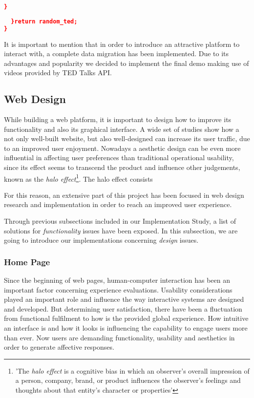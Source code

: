 \documentclass{acm_proc_article-sp}
\begin{document}
\begin{lstlisting}[language=json,firstnumber=1]
      }
      
  }return random_ted; 
}
\end{lstlisting}

It is important to mention that in order to introduce an attractive platform to interact with, a complete data migration has been implemented. Due to its advantages and popularity we decided to implement the final demo making use of videos provided by TED Talks API\cite{cettolo2012wit3}.

\subsection{Web Design}
While building a web platform, it is important to design how to improve its functionality and also its graphical interface. A wide set of studies \cite{allen2012smashing} show how a not only well-built website, but also well-designed can increase its user traffic, due to an improved user enjoyment. Nowadays a aesthetic design 
can be even more influential in affecting user preferences 
than traditional operational usability, since its effect seems to transcend the product and influence other judgements, known as the \textit{halo effect}\cite{de2006interaction}\cite{wiki:halo}\footnote{'The \textit{halo effect} is a cognitive bias in which an observer's overall impression of a person, company, brand, or product influences the observer's feelings and thoughts about that entity's character or properties'}. The halo effect consists 


For this reason, an extensive part of this project has been focused in web design research and implementation in order to reach an improved user experience. 

Through previous subsections included in our Implementation Study, a list of solutions for \textit{functionality} issues have been exposed. In this subsection, we are going to introduce our implementations concerning \textit{design} issues. 

\subsubsection{Home Page}
Since the beginning of web pages, human-computer interaction has been an important factor concerning experience evaluations\cite{monk2004product}. Usability considerations played an important role and influence the way interactive systems are designed and developed\cite{green2003pleasure}. But determining user satisfaction, there have been a  fluctuation from functional fulfilment to how is the provided global experience\cite{de2006interaction}. How intuitive an interface is and how it looks is influencing the capability to engage users more than ever\cite{allen2012smashing}. Now users are demanding functionality, usability and aesthetics in order to generate affective responses. 
\end{document}
